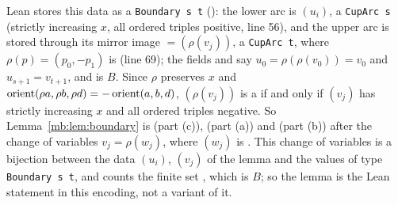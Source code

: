 \begin{remark}\label{mb:rem:boundary}
Lean stores this data as a \texttt{Boundary s t} (): the lower
arc  is $(u_i)$, a \texttt{CupArc s} (strictly increasing $x$, all ordered triples positive, line 56), and the
upper arc is stored through its mirror image ${}=(\rho(v_j))$, a \texttt{CupArc t}, where
$\rho(p)=(p_0,-p_1)$ is  (line 69); the fields  and  say
$u_0=\rho(\rho(v_0))=v_0$ and $u_{s+1}=v_{t+1}$, and  is $B$. Since $\rho$ preserves $x$ and
$\operatorname{orient}(\rho a,\rho b,\rho d)=-\operatorname{orient}(a,b,d)$, $(\rho(v_j))$ is a  if and only if $(v_j)$ has strictly
increasing $x$ and all ordered triples negative. So Lemma~\ref{mb:lem:boundary} is  (part (c)),
 (part (a)) and  (part (b)) after the change of variables
$v_j=\rho(w_j)$, where $(w_j)$ is . This change of variables is a bijection between the data
$(u_i)$, $(v_j)$ of the lemma and the values of type \texttt{Boundary s t}, and  counts the finite
set , which is $B$; so the lemma is the Lean statement in this encoding, not a variant of it.
\end{remark}


